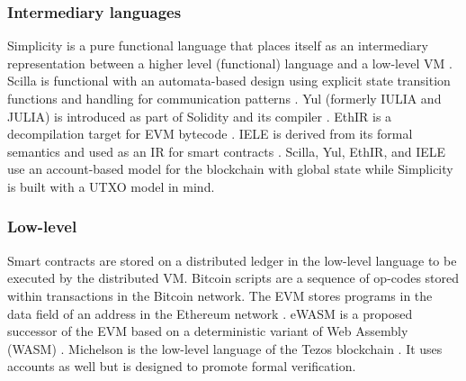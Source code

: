 \subsubsection{Intermediary languages}
Simplicity is a pure functional language that places itself as an intermediary representation between a higher level (functional) language and a low-level VM \cite{OConnor2017}. 
Scilla is functional with an automata-based design using explicit state transition functions and handling for communication patterns \cite{Sergey2018}. 
Yul (formerly IULIA and JULIA) is introduced as part of Solidity and its compiler \cite{EthereumFoundation2018IULIA}. 
EthIR is a decompilation target for EVM bytecode \cite{Albert2018}. 
IELE is derived from its formal semantics and used as an IR for smart contracts \cite{Kasampalis2018}. 
Scilla, Yul, EthIR, and IELE use an account-based model for the blockchain with global state while Simplicity is built with a UTXO model in mind.

\subsubsection{Low-level}
Smart contracts are stored on a distributed ledger in the low-level language to be executed by the distributed VM.
Bitcoin scripts are a sequence of op-codes stored within transactions in the Bitcoin network\cite{BitcoinWiki2018Script}. 
The EVM stores programs in the data field of an address in the Ethereum network \cite{Wood2014}. 
eWASM is a proposed successor of the EVM based on a deterministic variant of Web Assembly (WASM) \cite{Wanderer2015,EthereumFoundation2018ewasm}.
Michelson is the low-level language of the Tezos blockchain \cite{DynamicLedgerSolutions2017}. It uses accounts as well but is designed to promote formal verification.

